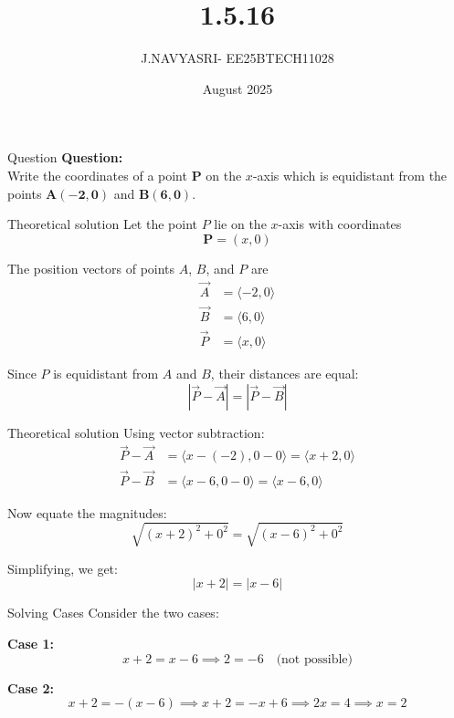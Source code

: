 \documentclass{beamer}
\title %
{1.5.16}
\date{August  2025}
\author %
{J.NAVYASRI- EE25BTECH11028}
\begin{document}
\frame{\titlepage}
\begin{frame}{Question}
\textbf{Question:} \\
Write the coordinates of a point \(\mathbf{P}\) on the \(x\)-axis which is equidistant from the points \(\mathbf{A(-2, 0)}\) and \(\mathbf{B(6, 0)}\).
\end{frame}

\begin{frame}{Theoretical solution}
Let the point \(P\) lie on the \(x\)-axis with coordinates
\begin{equation}
    \mathbf{P} = (x, 0)
\end{equation}

The position vectors of points \(A\), \(B\), and \(P\) are
\begin{align}
    \vec{A} &= \langle -2, 0 \rangle \\
    \vec{B} &= \langle 6, 0 \rangle \\
    \vec{P} &= \langle x, 0 \rangle
\end{align}

Since \(P\) is equidistant from \(A\) and \(B\), their distances are equal:
\begin{equation}
    |\vec{P} - \vec{A}| = |\vec{P} - \vec{B}|
\end{equation}

\end{frame}

\begin{frame}{Theoretical solution}
Using vector subtraction:
\begin{align}
    \vec{P} - \vec{A} &= \langle x - (-2), 0 - 0 \rangle = \langle x + 2, 0 \rangle \\
    \vec{P} - \vec{B} &= \langle x - 6, 0 - 0 \rangle = \langle x - 6, 0 \rangle
\end{align}

Now equate the magnitudes:
\begin{equation}
    \sqrt{(x+2)^2 + 0^2} = \sqrt{(x-6)^2 + 0^2}
\end{equation}

Simplifying, we get:
\begin{equation}
    |x + 2| = |x - 6|
\end{equation}
\end{frame}

\begin{frame}{Solving Cases}
Consider the two cases:

\textbf{Case 1:}
\begin{equation}
    x + 2 = x - 6 \implies 2 = -6 \quad \text{(not possible)}
\end{equation}

\textbf{Case 2:}
\begin{equation}
    x + 2 = -(x - 6) \implies x + 2 = -x + 6 \implies 2x = 4 \implies x = 2
\end{equation}
\end{frame}
\end{document}

